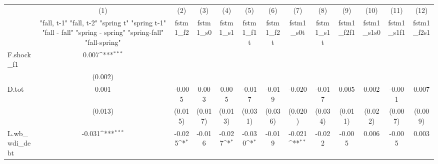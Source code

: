 {
\def\sym#1{\ifmmode^{#1}\else\(^{#1}\)\fi}
\begin{tabular}{l*{12}{c}}
\toprule
            &\multicolumn{1}{c}{(1)}&\multicolumn{1}{c}{(2)}&\multicolumn{1}{c}{(3)}&\multicolumn{1}{c}{(4)}&\multicolumn{1}{c}{(5)}&\multicolumn{1}{c}{(6)}&\multicolumn{1}{c}{(7)}&\multicolumn{1}{c}{(8)}&\multicolumn{1}{c}{(9)}&\multicolumn{1}{c}{(10)}&\multicolumn{1}{c}{(11)}&\multicolumn{1}{c}{(12)}\\
            &\multicolumn{1}{c}{  "fall, t-1" "fall, t-2" "spring t" "spring t-1"  "fall - fall" "spring - spring" "spring-fall" "fall-spring" }&\multicolumn{1}{c}{fstm1\_f2}&\multicolumn{1}{c}{fstm1\_s0}&\multicolumn{1}{c}{fstm1\_s1}&\multicolumn{1}{c}{fstm1\_f1t}&\multicolumn{1}{c}{fstm1\_f2t}&\multicolumn{1}{c}{fstm1\_s0t}&\multicolumn{1}{c}{fstm1\_s1t}&\multicolumn{1}{c}{fstm1\_f2f1}&\multicolumn{1}{c}{fstm1\_s1s0}&\multicolumn{1}{c}{fstm1\_s1f1}&\multicolumn{1}{c}{fstm1\_f2s1}\\
\midrule
F.shock\_f1  &       0.007\sym{***}&                     &                     &                     &                     &                     &                     &                     &                     &                     &                     &                     \\
            &     (0.002)         &                     &                     &                     &                     &                     &                     &                     &                     &                     &                     &                     \\
\addlinespace
D.tot       &       0.001         &      -0.005         &       0.003         &       0.005         &      -0.017         &      -0.019         &      -0.020         &      -0.017         &       0.005         &       0.002         &      -0.001         &       0.007         \\
            &     (0.013)         &     (0.015)         &     (0.017)         &     (0.013)         &     (0.031)         &     (0.036)         &     (0.020)         &     (0.034)         &     (0.011)         &     (0.022)         &     (0.007)         &     (0.009)         \\
\addlinespace
L.wb\_wdi\_debt&      -0.031\sym{***}&      -0.025\sym{*}  &      -0.016         &      -0.027\sym{*}  &      -0.030\sym{*}  &      -0.019         &      -0.021\sym{**} &      -0.022         &      -0.005         &       0.006         &      -0.005         &       0.003         \\

\end{tabular}}
